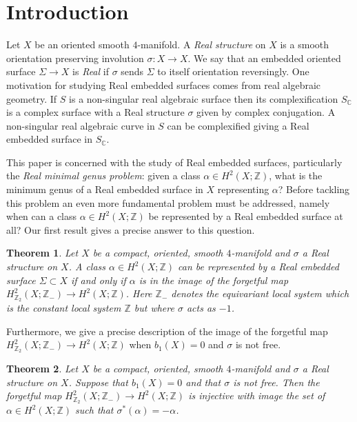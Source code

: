 \documentclass{amsart}
\newtheorem{theorem}{Theorem}[section]
\theoremstyle{definition}
\theoremstyle{remark}
\numberwithin{equation}{section}
\begin{document}


\section{Introduction}

Let $X$ be an oriented smooth $4$-manifold. A {\em Real structure} on $X$ is a smooth orientation preserving involution $\sigma : X \to X$. We say that an embedded oriented surface $\Sigma \to X$ is {\em Real} if $\sigma$ sends $\Sigma$ to itself orientation reversingly. One motivation for studying Real embedded surfaces comes from real algebraic geometry. If $S$ is a non-singular real algebraic surface then its complexification $S_{\mathbb{C}}$ is a complex surface with a Real structure $\sigma$ given by complex conjugation. A non-singular real algebraic curve in $S$ can be complexified giving a Real embedded surface in $S_{\mathbb{C}}$.

This paper is concerned with the study of Real embedded surfaces, particularly the {\em Real minimal genus problem}: given a class $\alpha \in H^2(X ; \mathbb{Z})$, what is the minimum genus of a Real embedded surface in $X$ representing $\alpha$? Before tackling this problem an even more fundamental problem must be addressed, namely when can a class $\alpha \in H^2(X ; \mathbb{Z})$ be represented by a Real embedded surface at all? Our first result gives a precise answer to this question.

\begin{theorem}
Let $X$ be a compact, oriented, smooth $4$-manifold and $\sigma$ a Real structure on $X$. A class $\alpha \in H^2(X ; \mathbb{Z})$ can be represented by a Real embedded surface $\Sigma \subset X$ if and only if $\alpha$ is in the image of the forgetful map $H^2_{\mathbb{Z}_2}(X ; \mathbb{Z}_-) \to H^2(X ; \mathbb{Z})$. Here $\mathbb{Z}_-$ denotes the equivariant local system which is the constant local system $\mathbb{Z}$ but where $\sigma$ acts as $-1$.
\end{theorem}

Furthermore, we give a precise description of the image of the forgetful map $H^2_{\mathbb{Z}_2}(X ; \mathbb{Z}_-) \to H^2(X ; \mathbb{Z})$ when $b_1(X) = 0$ and $\sigma$ is not free.

\begin{theorem}
Let $X$ be a compact, oriented, smooth $4$-manifold and $\sigma$ a Real structure on $X$. Suppose that $b_1(X) = 0$ and that $\sigma$ is not free. Then the forgetful map $H^2_{\mathbb{Z}_2}(X ; \mathbb{Z}_-) \to H^2(X ; \mathbb{Z})$ is injective with image the set of $\alpha \in H^2(X ; \mathbb{Z})$ such that $\sigma^*(\alpha) = -\alpha$.
\end{theorem}
\end{document}
